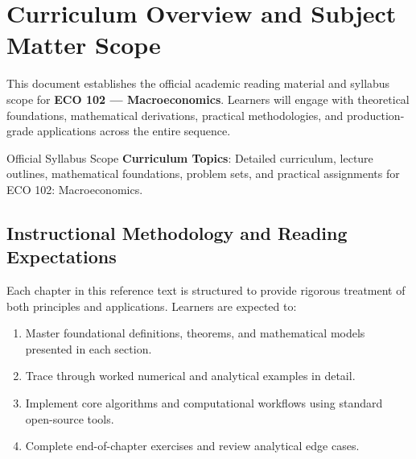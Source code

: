 \section{Curriculum Overview and Subject Matter Scope}

This document establishes the official academic reading material and syllabus scope for \textbf{ECO 102 --- Macroeconomics}. Learners will engage with theoretical foundations, mathematical derivations, practical methodologies, and production-grade applications across the entire sequence.

\begin{InsightBox}{Official Syllabus Scope}
  \textbf{Curriculum Topics}: Detailed curriculum, lecture outlines, mathematical foundations, problem sets, and practical assignments for ECO 102: Macroeconomics.
\end{InsightBox}

\subsection{Instructional Methodology and Reading Expectations}

Each chapter in this reference text is structured to provide rigorous treatment of both principles and applications. Learners are expected to:
\begin{enumerate}
  \item Master foundational definitions, theorems, and mathematical models presented in each section.
  \item Trace through worked numerical and analytical examples in detail.
  \item Implement core algorithms and computational workflows using standard open-source tools.
  \item Complete end-of-chapter exercises and review analytical edge cases.
\end{enumerate}

